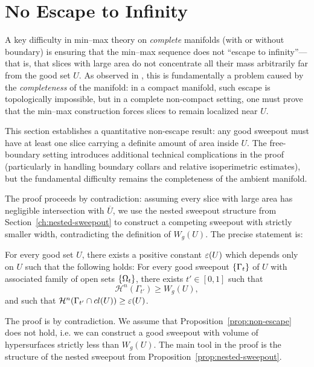 \section{No Escape to Infinity}\label{ch:no-escape-to-infinity}

A key difficulty in min--max theory on \emph{complete} manifolds (with or without boundary) is ensuring that the min--max sequence does not ``escape to infinity''---that is, that slices with large area do not concentrate all their mass arbitrarily far from the good set $U$. As observed in \cite{CL20}, this is fundamentally a problem caused by the \emph{completeness} of the manifold: in a compact manifold, such escape is topologically impossible, but in a complete non-compact setting, one must prove that the min--max construction forces slices to remain localized near $U$.

This section establishes a quantitative non-escape result: any good sweepout must have at least one slice carrying a definite amount of area inside $U$. The free-boundary setting introduces additional technical complications in the proof (particularly in handling boundary collars and relative isoperimetric estimates), but the fundamental difficulty remains the completeness of the ambient manifold.

The proof proceeds by contradiction: assuming every slice with large area has negligible intersection with $\overline{U}$, we use the nested sweepout structure from Section~\ref{ch:nested-sweepout} to construct a competing sweepout with strictly smaller width, contradicting the definition of $W_g(U)$. The precise statement is:

\begin{proposition}\label{prop:non-escape}
    For every good set $U$, there exists a positive constant $\varepsilon(U)$ which depends only on $U$ such that the following holds: For every good sweepout $\left\{\Gamma_t\right\}$ of $U$ with associated family of open sets $\left\{\Omega_t\right\}$, there exists $t' \in [0, 1]$ such that
    \begin{equation*}
        \mathcal{H}^n(\Gamma_{t'}) \geq W_g(U),
    \end{equation*}
    and such that $\mathcal{H}^n(\Gamma_{t'}\cap cl(U)) \geq \varepsilon(U)$.
\end{proposition}

The proof is by contradiction. We assume that Proposition~\ref{prop:non-escape} does not hold, i.e. we can construct a good sweepout with volume of hypersurfaces strictly less than $W_g(U)$. The main tool in the proof is the structure of the nested sweepout from Proposition~\ref{prop:nested-sweepout}.

